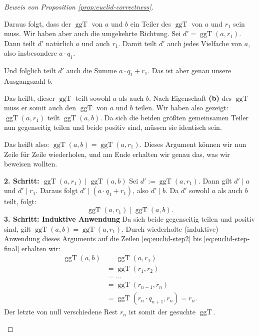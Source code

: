 \begin{proof}[Beweis von Proposition \ref{prop:euclid-correctness}]
\begin{spoken-clean}[00:36:29 - 00:37:50]
Daraus folgt, dass der $\operatorname{ggT}$ von $a$ und $b$ ein Teiler des $\operatorname{ggT}$ von $a$ und $r_1$ sein muss. Wir haben aber auch die umgekehrte Richtung. Sei $d' = \operatorname{ggT}(a, r_1)$. Dann teilt $d'$ natürlich $a$ und auch $r_1$. Damit teilt $d'$ auch jedes Vielfache von $a$, also insbesondere $a \cdot q_1$.
\end{spoken-clean}

\begin{spoken-clean}[00:37:50 - 00:39:09]
Und folglich teilt $d'$ auch die Summe $a \cdot q_1 + r_1$. Das ist aber genau unsere Ausgangszahl $b$.

Das heißt, dieser $\operatorname{ggT}$ teilt sowohl $a$ als auch $b$. Nach Eigenschaft \textbf{(b)} des $\operatorname{ggT}$ muss er somit auch den $\operatorname{ggT}$ von $a$ und $b$ teilen. Wir haben also gezeigt: $\operatorname{ggT}(a, r_1)$ teilt $\operatorname{ggT}(a, b)$. Da sich die beiden größten gemeinsamen Teiler nun gegenseitig teilen und beide positiv sind, müssen sie identisch sein.

Das heißt also: $\operatorname{ggT}(a, b) = \operatorname{ggT}(a, r_1)$. Dieses Argument können wir nun Zeile für Zeile wiederholen, und am Ende erhalten wir genau das, was wir beweisen wollten.
\end{spoken-clean}

\begin{math-stroke}
\begin{short-proof}[Fortsetzung]
\textbf{2. Schritt: $\operatorname{ggT}(a, r_1) \mid \operatorname{ggT}(a, b)$}
Sei $d' := \operatorname{ggT}(a, r_1)$. Dann gilt $d' \mid a$ und $d' \mid r_1$.
Daraus folgt $d' \mid (a \cdot q_1 + r_1)$, also $d' \mid b$.
Da $d'$ sowohl $a$ als auch $b$ teilt, folgt:
\[
\operatorname{ggT}(a, r_1) \mid \operatorname{ggT}(a, b).
\]
\textbf{3. Schritt: Induktive Anwendung}
Da sich beide gegenseitig teilen und positiv sind, gilt $\operatorname{ggT}(a, b) = \operatorname{ggT}(a, r_1)$.
Durch wiederholte (induktive) Anwendung dieses Arguments auf die Zeilen \eqref{eq:euclid-step2} bis \eqref{eq:euclid-step-final} erhalten wir:
\begin{align*}
\operatorname{ggT}(a, b) &= \operatorname{ggT}(a, r_1) \\
&= \operatorname{ggT}(r_1, r_2) \\
&= \dots \\
&= \operatorname{ggT}(r_{n-1}, r_n) \\
&= \operatorname{ggT}(r_n \cdot q_{n+1}, r_n) = r_n.
\end{align*}
Der letzte von null verschiedene Rest $r_n$ ist somit der gesuchte $\operatorname{ggT}$.
\end{short-proof}
\end{math-stroke}
\end{proof}


